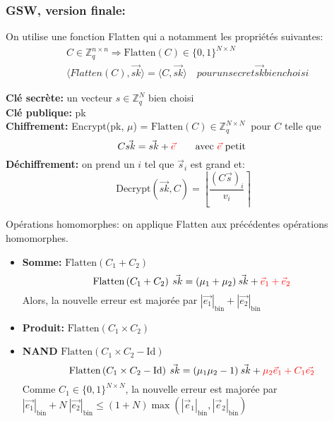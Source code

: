 \documentclass[11pt,xcolor={usenames,dvipsnames}]{beamer}
\newcommand{\ZZq}{\mathbb{Z}_q}
\newcommand{\bnorm}[1]{{|#1|}_{\text{bin}}}
\begin{document}
\begin{frame} 
\frametitle{GSW, version finale:}
On utilise une fonction Flatten qui a notamment les propriétés suivantes:
\begin{align*}
&C \in \ZZq^{n \times n} \Rightarrow \text{Flatten}(C) \in \{0,1\}^{N \times N} \\
& \langle Flatten(C), \vec{sk} \rangle = \langle C, \vec{sk} \rangle \quad{ pour un secret \vec{sk} bien choisi}
\end{align*}

\textbf{Clé secrète:} un vecteur $s \in \ZZq^{N}$ bien choisi\\
\textbf{Clé publique:} pk\\
\textbf{Chiffrement:} Encrypt(pk, $\mu$) = $\text{Flatten}(C)\in \ZZq^{N \times N}\:$ pour $C$ telle que  
\[C \vec{sk} = \vec{sk} + {\color{red}\vec{e}}\qquad \text{avec }  {\color{red}\vec{e}} \text{ petit} \]
\textbf{Déchiffrement:} on prend un $i$ tel que $\vec{s}_i$ est grand et:
\[\text{Decrypt}(\vec{sk}, C) = \left\lfloor \frac{{\left(C\vec{s}\right)}_i}{v_i} \right\rceil \]

Opérations homomorphes: on applique Flatten aux précédentes opérations homomorphes.

\begin{itemize}
\item \textbf{Somme:} $\text{Flatten}\left(C_1 + C_2\right)\quad$ \\
\[\text{Flatten}\left(C_1 + C_2\right)\: \vec{sk} = (\mu_1 + \mu_2)\:\vec{sk} + {\color{red}\vec{e}_1 + \vec{e}_2}\]
Alors, la nouvelle erreur est majorée par $\bnorm{\vec{e_1}} + \bnorm{\vec{e_2}}$
\item \textbf{Produit:} $\text{Flatten}\left(C_1 \times C_2\right)\quad$ \\
\item \textbf{NAND} $\text{Flatten}\left(C_1 \times C_2 - \text{Id}\right)\quad$ \\
\[\text{Flatten}\left(C_1 \times C_2 - \text{Id}\right)\: \vec{sk} = (\mu_1 \mu_2 - 1)\: \vec{sk} + {\color{red}\mu_2 \vec{e}_1 + C_1 \vec{e_2}}\]
Comme $C_1 \in \{0,1\}^{N\times N}$, la nouvelle erreur est majorée par 
$\bnorm{\vec{e_1}} + N\:\bnorm{\vec{e_2}} \leqslant (1+N) \max\left(\bnorm{\vec{e}_1},\bnorm{\vec{e}_2}\right)$
\end{itemize}
\end{frame} 
  
  
\end{document}
